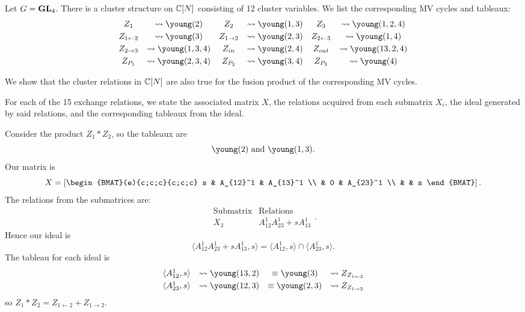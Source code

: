 \documentclass[draft]{article}
\begin{document}
Let $G = {\mathbf{GL}}_4$. There is a cluster structure on $\mathbb C[N]$ consisting of 12 cluster variables. We list the corresponding MV cycles and tableaux:
\[\begin{array}{cccccc} \vspace{1mm}
    Z_1 &\leadsto \young(2) & Z_2 &\leadsto \young(1,3) & Z_3 &\leadsto \young(1,2,4) \\ \vspace{1mm}
    Z_{1 \leftarrow 2} &\leadsto \young(3) & Z_{1 \rightarrow 2} &\leadsto \young(2,3) & Z_{2 \leftarrow 3} &\leadsto \young(1,4) \\ \vspace{1mm}
     Z_{2 \rightarrow 3} &\leadsto \young(1,3,4) & Z_{in} &\leadsto \young(2,4) & Z_{out} &\leadsto \young(13,2,4)  \\
    Z_{P_1} &\leadsto \young(2,3,4) & Z_{P_2} &\leadsto \young(3,4) & Z_{P_3} &\leadsto \young(4)
\end{array}\]

We show that the cluster relations in $\mathbb C[N]$ are also true for the fusion product of the corresponding MV cycles.

For each of the 15 exchange relations, we state the associated matrix $X$, the relations acquired from each submatrix $X_i$, the ideal generated by said relations, and the corresponding tableaux from the ideal.

\begin{example}
Consider the product $Z_1 * Z_2$, so the tableaux are
\[
\young(2) \text{ and } \young(1,3).
\]
Our matrix is
\[
X = \left[\begin{BMAT}(e){c;c;c}{c;c;c}
    s & A_{12}^1 & A_{13}^1 \\
     & 0 & A_{23}^1 \\
     & & s
\end{BMAT}
\right].
\]
The relations from the submatrices are:
\[
\begin{array}{c|c}
    \text{Submatrix} & \text{Relations} \\ \hline
    X_3 & A_{12}^1A_{23}^1+sA_{13}^1
\end{array}.
\]
Hence our ideal is
$$\langle A_{12}^1A_{23}^1+sA_{13}^1,s \rangle = 
\langle A_{12}^1,s \rangle \cap \langle A_{23}^1,s \rangle.$$
The tableau for each ideal is
\[\begin{array}{cccc}\vspace{1mm}
    \langle A_{12}^1,s \rangle &\leadsto \young(13,2) &\equiv \young(3) &\leadsto Z_{Z_{1 \leftarrow 2}} \\ 
    \langle A_{23}^1,s \rangle &\leadsto \young(12,3) &\equiv \young(2,3) &\leadsto Z_{Z_{1 \rightarrow 2}}
\end{array}
\]
so $Z_1 * Z_2 = Z_{1 \leftarrow 2} + Z_{1 \rightarrow 2}$.
\end{example}
\end{document}
